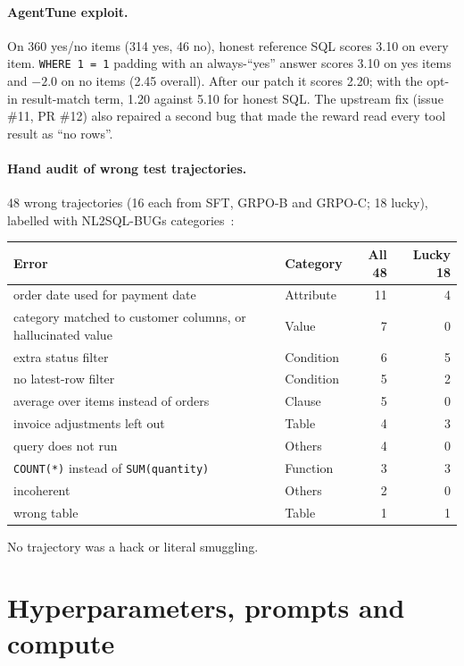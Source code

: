 \documentclass{article}
\begin{document}
\paragraph{AgentTune exploit.}
On 360 yes/no items (314 yes, 46 no), honest reference SQL scores 3.10 on every item. \texttt{WHERE 1 = 1} padding with an always-``yes'' answer scores 3.10 on yes items and $-2.0$ on no items (2.45 overall). After our patch it scores 2.20; with the opt-in result-match term, 1.20 against 5.10 for honest SQL. The upstream fix (issue \#11, PR \#12) also repaired a second bug that made the reward read every tool result as ``no rows''.

\paragraph{Hand audit of wrong test trajectories.}
48 wrong trajectories (16 each from SFT, GRPO-B and GRPO-C; 18 lucky), labelled with NL2SQL-BUGs categories~\citep{liu2025bugs}:
\begin{center}\small
\begin{tabular}{llrr}
\toprule
Error & Category & All 48 & Lucky 18 \\
\midrule
order date used for payment date & Attribute & 11 & 4 \\
category matched to customer columns, or hallucinated value & Value & 7 & 0 \\
extra status filter & Condition & 6 & 5 \\
no latest-row filter & Condition & 5 & 2 \\
average over items instead of orders & Clause & 5 & 0 \\
invoice adjustments left out & Table & 4 & 3 \\
query does not run & Others & 4 & 0 \\
\texttt{COUNT(*)} instead of \texttt{SUM(quantity)} & Function & 3 & 3 \\
incoherent & Others & 2 & 0 \\
wrong table & Table & 1 & 1 \\
\bottomrule
\end{tabular}
\end{center}
No trajectory was a hack or literal smuggling.

\section{Hyperparameters, prompts and compute}
\label{app:hyper}
\end{document}
